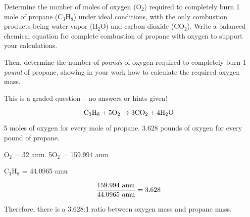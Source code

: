 

Determine the number of moles of oxygen (O$_{2}$) required to completely burn 1 mole of propane (C$_{3}$H$_{8}$) under ideal conditions, with the only combustion products being water vapor (H$_{2}$O) and carbon dioxide (CO$_{2}$).  Write a balanced chemical equation for complete combustion of propane with oxygen to support your calculations.

\vskip 100pt

Then, determine the number of {\it pounds} of oxygen required to completely burn 1 {\it pound} of propane, showing in your work how to calculate the required oxygen mass.

\vfil

\eject






This is a graded question -- no answers or hints given!







$$\hbox{C}_3\hbox{H}_8 + 5\hbox{O}_2 \to 3\hbox{CO}_2 + 4\hbox{H}_2\hbox{O}$$

5 moles of oxygen for every mole of propane.  3.628 pounds of oxygen for every pound of propane.

\vskip 10pt

O$_{2}$ = 32 amu.  5O$_{2}$ = 159.994 amu

\vskip 10pt

C$_{3}$H$_{8}$ = 44.0965 amu

$${159.994 \hbox{ amu} \over 44.0965 \hbox{ amu}} = 3.628$$

Therefore, there is a 3.628:1 ratio between oxygen mass and propane mass.




